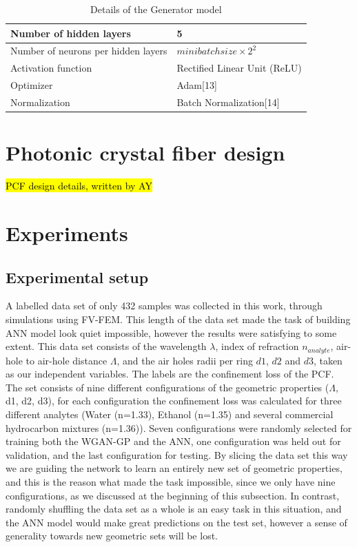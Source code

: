 \documentclass[draft, a4, 10pt, onecolumn]{IEEEtran}
\begin{document}
\begin{table}[h]
\centering
 \begin{tabular}{|l|l|}
    \hline
Number of hidden layers & 5 \\
\hline
Number of neurons per hidden layers & $ minibatchsize\times2^{2} $  \\
\hline
Activation function & Rectified Linear Unit (ReLU)  \\
\hline
Optimizer & Adam[13]  \\
\hline
Normalization & Batch Normalization[14] \\
\hline
    \end{tabular}
\caption{Details of the Generator model}
\end{table}

\section{Photonic crystal fiber design}
\label{sec:pcf}

\hl{PCF design details, written by AY}

\section{Experiments}
\label{sec:exp}

\subsection{Experimental setup}

A labelled data set of only 432 samples was collected in this work, through simulations using FV-FEM. This length of the data set made the task of building ANN model look quiet impossible, however the results were satisfying to some extent. This data set consists of the wavelength $\lambda$, index of refraction $n_{analyte} $, air-hole to air-hole distance $ \Lambda $, and the air holes radii per ring $d1$, $d2$ and $d3$, taken as our independent variables. The labels are the confinement loss of the PCF. The set consists of nine different configurations of the geometric properties ($ \Lambda $, d1, d2, d3), for each configuration the confinement loss was calculated for three different analytes (Water (n=1.33), Ethanol (n=1.35) and several commercial hydrocarbon mixtures (n=1.36)). Seven configurations were randomly selected for training both the WGAN-GP and the ANN, one configuration was held out for validation, and the last configuration for testing. By slicing the data set this way we are guiding the network to learn an entirely new set of geometric properties, and this is the reason what made the task impossible, since we only have nine configurations, as we discussed at the beginning of this subsection. In contrast, randomly shuffling the data set as a whole is an easy task in this situation, and the ANN model would make great predictions on the test set, however a sense of generality towards new geometric sets will be lost.
\end{document}
